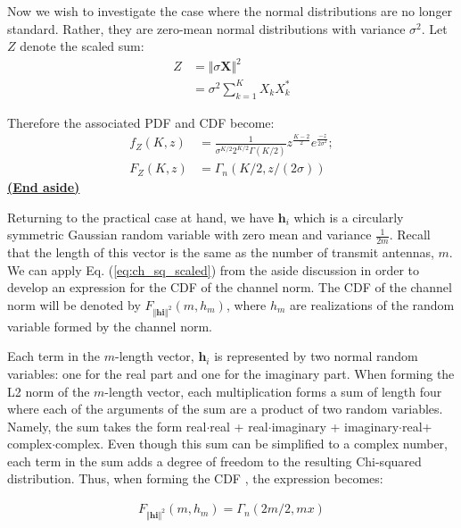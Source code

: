 Now we wish to investigate the case where the normal distributions are no longer standard. Rather, they are zero-mean normal distributions with variance $\sigma^2$. Let $Z$ denote the scaled sum:
\begin{equation}\label{eq:ch_sq_sum_scaled}
    \begin{aligned}
        Z &= \Vert \sigma \textbf{X} \Vert^2\\
          &= \sigma^2 \sum_{k = 1}^K X_kX_k^*
    \end{aligned}
\end{equation}

Therefore the associated PDF and CDF become:
\begin{equation}\label{eq:ch_sq_scaled}
    \begin{aligned}
        f_Z(K,z) &= \frac{1}{\sigma^{K/2}2^{K/2}\Gamma(K/2)}z^{\frac{K-2}{2}}e^{\frac{-z}{2\sigma^2}};\\
        F_Z(K,z) &= \Gamma_n(K/2,z/(2\sigma))
    \end{aligned}
\end{equation}
\underline{\textbf{(End aside)}}

Returning to the practical case at hand, we have  $\textbf{h}_i$ which is a circularly symmetric Gaussian random variable with zero mean and variance  $\frac{1}{2m}$. Recall that the length of this vector is the same as the number of transmit antennas, $m$. We can apply Eq. (\ref{eq:ch_sq_scaled}) from the aside discussion in order to develop an expression for the CDF of the channel norm. The CDF of the channel norm will be denoted by $F_{\Vert\textbf{hi}\Vert^2}(m,h_m)$, where $h_m$ are realizations of the random variable formed by the channel norm. 

Each term in the $m$-length vector, $\textbf{h}_i$ is represented by two normal random variables: one for the real part and one for the imaginary part. When forming the L2 norm of the $m$-length vector, each multiplication forms a sum of length four where each of the arguments of the sum are a product of two random variables. Namely, the sum takes the form real$\cdot$real + real$\cdot$imaginary + imaginary$\cdot$real+ complex$\cdot$complex. Even though this sum can be simplified to a complex number, each term in the sum adds a degree of freedom to the resulting Chi-squared distribution. Thus, when forming the CDF , the expression becomes:

\begin{equation}\label{eq:ch_sq_cdf_chan}
    \begin{aligned}
        F_{\Vert\textbf{hi}\Vert^2}(m,h_m) = \Gamma_n(2m/2,mx)
    \end{aligned}
\end{equation}

